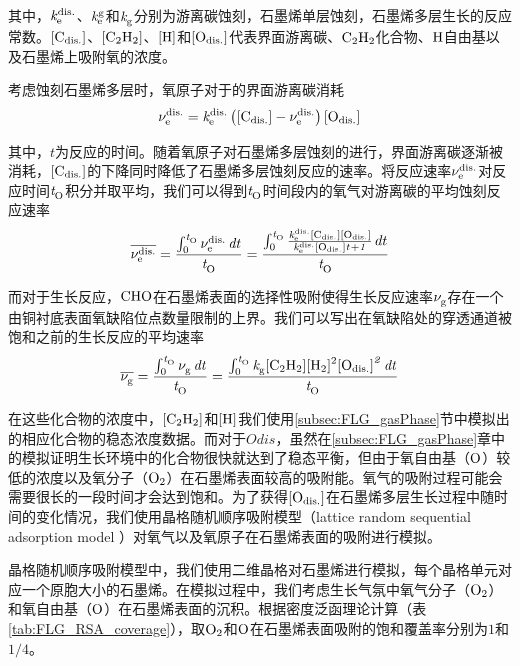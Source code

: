 其中，$\it{k_{\rm e}^{\rm dis.}} \it$、$\it{k_{\rm e}^{\rm g}} \it$和$\it{k_{\rm g}^{\rm }} \it$分别为游离碳蚀刻，石墨烯单层蚀刻，石墨烯多层生长的反应常数。$\rm{\left[C_{dis.}\right]} \it$、$\cemb{[C2H2]}$、$\cemb{[H]}$和$\rm{\left[O_{dis.}\right]} \it$代表界面游离碳、$\cemb{C2H2}$化合物、$\cemb{H}$自由基以及石墨烯上吸附氧的浓度。

考虑蚀刻石墨烯多层时，氧原子对于的界面游离碳消耗\chinesecolon
\begin{equation}
    \nu_{\rm e}^{\rm dis.} \it=\it{k_{\rm e}^{\rm dis.}} \it\left(\rm{\left[C_{dis.}\right]} \it-\nu_{\rm e}^{\rm dis.} \it\right)\rm{\left[O_{dis.}\right]} \it
\end{equation}

其中，$t$为反应的时间。随着氧原子对石墨烯多层蚀刻的进行，界面游离碳逐渐被消耗，$\rm{\left[C_{dis.}\right]} \it$的下降同时降低了石墨烯多层蚀刻反应的速率。将反应速率$\nu_{\rm e}^{\rm dis.} \it$对反应时间$\it{t_{\rm O}^{\rm }} \it$积分并取平均，我们可以得到$\it{t_{\rm O}^{\rm }} \it$时间段内的氧气对游离碳的平均蚀刻反应速率\chinesecolon
\begin{equation}
    \overline{\nu_{\rm e}^{\rm dis.} \it}=\frac{\int_{0}^{\it{t_{\rm O}^{\rm }} \it} \nu_{\rm e}^{\rm dis.} \it \,dt }{\it{t_{\rm O}^{\rm }} \it}=\frac{\int_{0}^{\it{t_{\rm O}^{\rm }} \it} \frac{\it{k_{\rm e}^{\rm dis.}} \it\rm{\left[C_{dis.}\right]} \it\rm{\left[O_{dis.}\right]} \it}{\it{k_{\rm e}^{\rm dis.}} \it\rm{\left[O_{dis.}\right]} \it \it{t_{\rm }^{\rm }} \it + 1} \,dt}{\it{t_{\rm O}^{\rm }} \it}
\end{equation}

而对于生长反应，$\cemb{CHO}$在石墨烯表面的选择性吸附使得生长反应速率$\nu_{\rm g}^{\rm } \it$存在一个由铜衬底表面氧缺陷位点数量限制的上界。我们可以写出在氧缺陷处的穿透通道被饱和之前的生长反应的平均速率\chinesecolon
\begin{equation}
    \overline{\RateV{g}{}}=\frac{\int_{0}^{\ReactTime{O}{}} \RateV{g}{} \,dt }{\ReactTime{O}{}}= \frac{\int_{0}^{\ReactTime{O}{}} \RateK{g}{}\cemb{[C2H2][H2]^2}\Odis^2 \,dt }{\ReactTime{O}{}}
\end{equation}

在这些化合物的浓度中，$\cemb{[C2H2]}$和$\cemb{[H]}$我们使用\ref{subsec:FLG_gasPhase}节中模拟出的相应化合物的稳态浓度数据。而对于$Odis$，虽然在\ref{subsec:FLG_gasPhase}章中的模拟证明生长环境中的化合物很快就达到了稳态平衡，但由于氧自由基（$\cemb{O}$）较低的浓度以及氧分子（$\cemb{O2}$）在石墨烯表面较高的吸附能。氧气的吸附过程可能会需要很长的一段时间才会达到饱和。为了获得$\rm{\left[O_{dis.}\right]} \it$在石墨烯多层生长过程中随时间的变化情况，我们使用晶格随机顺序吸附模型（lattice random sequential adsorption model ）对氧气以及氧原子在石墨烯表面的吸附进行模拟。

晶格随机顺序吸附模型中，我们使用二维晶格对石墨烯进行模拟，每个晶格单元对应一个原胞大小的石墨烯。在模拟过程中，我们考虑生长气氛中氧气分子（$\cemb{O2}$）和氧自由基（$\cemb{O}$）在石墨烯表面的沉积。根据密度泛函理论计算（表\ref{tab:FLG_RSA_coverage}），取$\cemb{O2}$和$\cemb{O}$在石墨烯表面吸附的饱和覆盖率分别为$1$和$1 / 4$。

